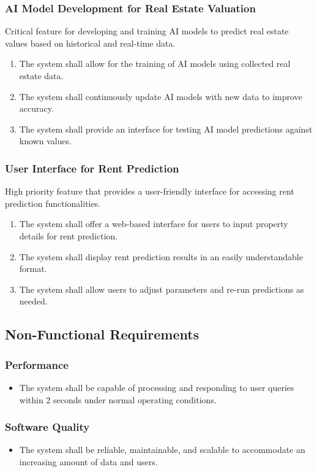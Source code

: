 \documentclass[12pt]{article}
\begin{document}
\subsubsection{AI Model Development for Real Estate Valuation}
Critical feature for developing and training AI models to predict real estate values based on historical and real-time data.
\begin{enumerate}
    \item The system shall allow for the training of AI models using collected real estate data.
    \item The system shall continuously update AI models with new data to improve accuracy.
    \item The system shall provide an interface for testing AI model predictions against known values.
\end{enumerate}

\subsubsection{User Interface for Rent Prediction}
High priority feature that provides a user-friendly interface for accessing rent prediction functionalities.
\begin{enumerate}
    \item The system shall offer a web-based interface for users to input property details for rent prediction.
    \item The system shall display rent prediction results in an easily understandable format.
    \item The system shall allow users to adjust parameters and re-run predictions as needed.
\end{enumerate}

\subsection{Non-Functional Requirements}

\subsubsection{Performance}
\begin{itemize}
    \item The system shall be capable of processing and responding to user queries within 2 seconds under normal operating conditions.
\end{itemize}

\subsubsection{Software Quality}
\begin{itemize}
    \item The system shall be reliable, maintainable, and scalable to accommodate an increasing amount of data and users.
\end{itemize}
\end{document}
